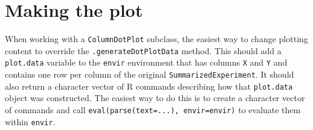 \documentclass[
]{book}
\begin{document}
\hypertarget{making-the-plot}{%
\section{Making the plot}\label{making-the-plot}}

When working with a \texttt{ColumnDotPlot} subclass, the easiest way to change plotting content to override the \texttt{.generateDotPlotData} method.
This should add a \texttt{plot.data} variable to the \texttt{envir} environment that has columns \texttt{X} and \texttt{Y} and contains one row per column of the original \texttt{SummarizedExperiment}.
It should also return a character vector of R commands describing how that \texttt{plot.data} object was constructed.
The easiest way to do this is to create a character vector of commands and call \texttt{eval(parse(text=...),\ envir=envir)} to evaluate them within \texttt{envir}.
\end{document}
